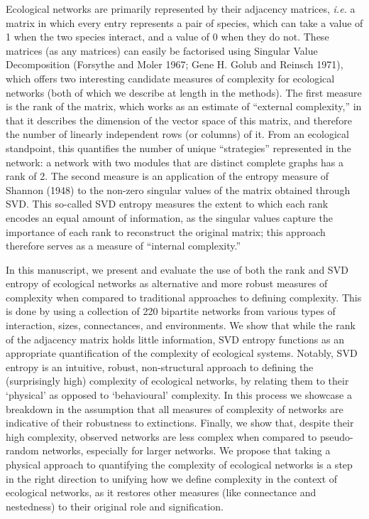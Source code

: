 \documentclass[10pt,oneside]{article}
\begin{document}
Ecological networks are primarily represented by their adjacency
matrices, \emph{i.e.} a matrix in which every entry represents a pair of
species, which can take a value of 1 when the two species interact, and
a value of 0 when they do not. These matrices (as any matrices) can
easily be factorised using Singular Value Decomposition (Forsythe and
Moler 1967; Gene H. Golub and Reinsch 1971), which offers two
interesting candidate measures of complexity for ecological networks
(both of which we describe at length in the methods). The first measure
is the rank of the matrix, which works as an estimate of ``external
complexity,'' in that it describes the dimension of the vector space of
this matrix, and therefore the number of linearly independent rows (or
columns) of it. From an ecological standpoint, this quantifies the
number of unique ``strategies'' represented in the network: a network
with two modules that are distinct complete graphs has a rank of 2. The
second measure is an application of the entropy measure of Shannon
(1948) to the non-zero singular values of the matrix obtained through
SVD. This so-called SVD entropy measures the extent to which each rank
encodes an equal amount of information, as the singular values capture
the importance of each rank to reconstruct the original matrix; this
approach therefore serves as a measure of ``internal complexity.''

In this manuscript, we present and evaluate the use of both the rank and
SVD entropy of ecological networks as alternative and more robust
measures of complexity when compared to traditional approaches to
defining complexity. This is done by using a collection of 220 bipartite
networks from various types of interaction, sizes, connectances, and
environments. We show that while the rank of the adjacency matrix holds
little information, SVD entropy functions as an appropriate
quantification of the complexity of ecological systems. Notably, SVD
entropy is an intuitive, robust, non-structural approach to defining the
(surprisingly high) complexity of ecological networks, by relating them
to their `physical' as opposed to `behavioural' complexity. In this
process we showcase a breakdown in the assumption that all measures of
complexity of networks are indicative of their robustness to
extinctions. Finally, we show that, despite their high complexity,
observed networks are less complex when compared to pseudo-random
networks, especially for larger networks. We propose that taking a
physical approach to quantifying the complexity of ecological networks
is a step in the right direction to unifying how we define complexity in
the context of ecological networks, as it restores other measures (like
connectance and nestedness) to their original role and signification.
\end{document}
